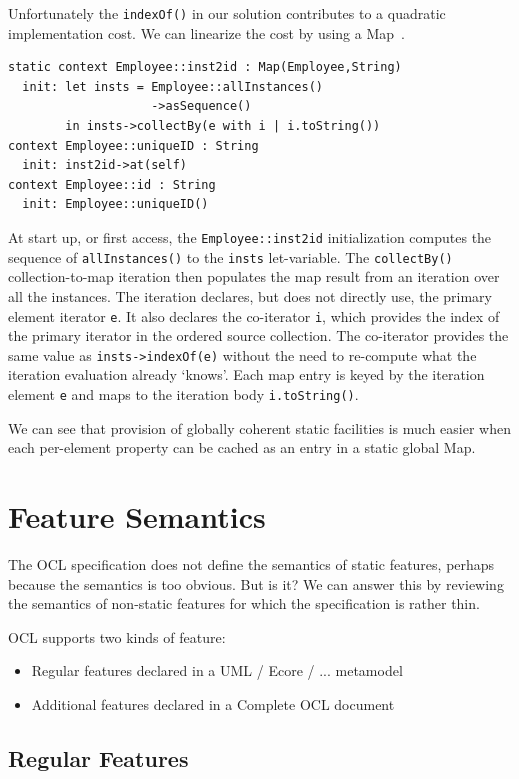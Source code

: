 \documentclass[sigconf]{acmart}
\begin{document}
Unfortunately the \verb|indexOf()| in our solution contributes to a quadratic implementation cost. We can linearize the cost by using a Map~\cite{Willink-Map}.

\begin{verbatim}
static context Employee::inst2id : Map(Employee,String)
  init: let insts = Employee::allInstances()
                    ->asSequence()
        in insts->collectBy(e with i | i.toString())
context Employee::uniqueID : String
  init: inst2id->at(self)
context Employee::id : String
  init: Employee::uniqueID()
\end{verbatim} 

At start up, or first access, the \verb|Employee::inst2id| initialization computes the sequence of \verb|allInstances()| to the \verb|insts| let-variable. The  \verb|collectBy()| collection-to-map iteration then populates the map result from an iteration over all the instances. The iteration declares, but does not directly use, the primary element iterator \verb|e|. It also declares the co-iterator \verb|i|,  which provides the index of the primary iterator in the ordered source collection. The co-iterator provides the same value as \verb|insts->indexOf(e)| without the need to re-compute what the iteration evaluation already `knows'. Each map entry is keyed by the iteration element \verb|e| and maps to the iteration body \verb|i.toString()|.

We can see that provision of globally coherent static facilities is much easier when each per-element property can be cached as an entry in a static global Map.

\section{Feature Semantics}\label{Static Semantics}

The OCL specification does not define the semantics of static features, perhaps because the semantics is too obvious. But is it? We can answer this by reviewing the semantics of non-static features for which the specification is rather thin.

OCL supports two kinds of feature:
\begin{itemize}
	\item Regular features declared in a UML / Ecore / ... metamodel
	\item Additional features declared in a Complete OCL document
\end{itemize}

\subsection{Regular Features}
\end{document}
